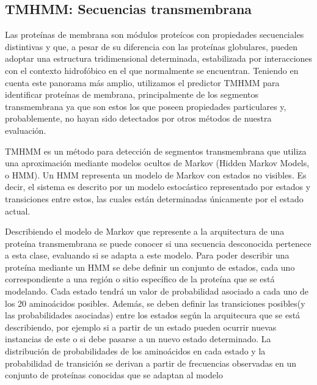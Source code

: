   
  
  
  
  
\subsection{TMHMM: Secuencias transmembrana} \label{tmhmm}

Las proteínas de membrana son módulos proteícos con propiedades secuenciales distintivas y que, a pesar de su diferencia con las proteínas globulares, 
pueden adoptar una estructura tridimensional determinada, estabilizada por interacciones con el contexto hidrofóbico en el que normalmente se encuentran.
Teniendo en cuenta este panorama más amplio, utilizamos el predictor TMHMM\cite{krogh2001predicting} para identificar proteínas de membrana,
principalmente de los segmentos transmembrana ya que son estos los que poseen propiedades particulares y, probablemente, no hayan sido detectados por otros métodos de nuestra evaluación.

TMHMM es un método para detección de segmentos transmembrana que utiliza una aproximación mediante modelos ocultos de Markov (Hidden Markov Models, o HMM).
Un HMM representa un modelo de Markov con estados no visibles. Es decir, el sistema es descrito por un modelo estocástico representado por estados y transiciones entre estos, las cuales están determinadas únicamente por el estado actual.

Describiendo el modelo de Markov que represente a la arquitectura de una proteína transmembrana se puede conocer si una secuencia desconocida pertenece a esta clase, evaluando si se adapta a este modelo.
Para poder describir una proteína mediante un HMM se debe definir un conjunto de estados, cada uno correspondiente a una región o sitio específico de la proteína que se está modelando.
Cada estado tendrá un valor de probabilidad asociado a cada uno de los 20 aminoácidos posibles. Además, se deben definir las transiciones posibles(y las probabilidades asociadas) entre los estados según la arquitecura que se está describiendo, por ejemplo si a partir 
de un estado pueden ocurrir nuevas instancias de este o si debe pasarse a un nuevo estado determinado.
La distribución de probabilidades de los aminoácidos en cada estado y la probabilidad de transición se derivan a partir de frecuencias observadas en un conjunto de proteínas conocidas que se adaptan al modelo


